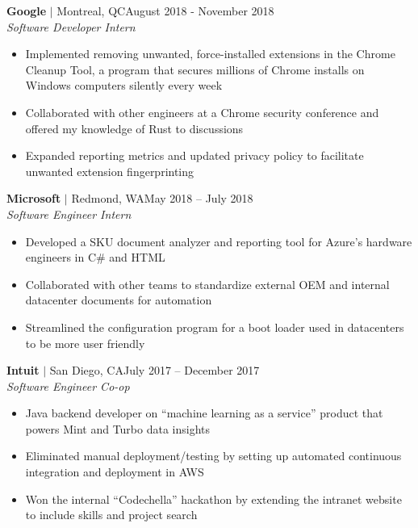\documentclass[overlapped,line]{res}
\begin{document}
\begin{resume}
\textbf{Google} $|$ Montreal, QC\hfill August 2018 - November 2018\\
{\sl Software Developer Intern}
\begin{itemize} \itemsep -2pt
	\item Implemented removing unwanted, force-installed extensions in the Chrome Cleanup Tool, a program that secures millions of Chrome installs on Windows computers silently every week
    \item Collaborated with other engineers at a Chrome security conference and
      offered my knowledge of Rust to discussions
    \item Expanded reporting metrics and updated privacy policy to facilitate unwanted extension fingerprinting
\end{itemize}

\textbf{Microsoft} $|$ Redmond, WA\hfill May 2018 \--- July 2018\\
{\sl Software Engineer Intern}
\begin{itemize} \itemsep -2pt
	\item Developed a SKU document analyzer and reporting tool for Azure's hardware engineers in C\# and HTML
	\item Collaborated with other teams to standardize external OEM and internal datacenter documents for automation
	\item Streamlined the configuration program for a boot loader used in datacenters to be more user friendly
\end{itemize}

\textbf{Intuit} $|$ San Diego, CA\hfill July 2017 \--- December 2017\\
{\sl Software Engineer Co-op}
\begin{itemize} \itemsep -2pt
	\item Java backend developer on ``machine learning as a service'' product that powers Mint and Turbo data insights
	\item Eliminated manual deployment/testing by setting up automated
      continuous integration and deployment in AWS
	\item Won the internal ``Codechella'' hackathon by extending the intranet website to include skills and project search
\end{itemize}



\end{resume}
\end{document}
